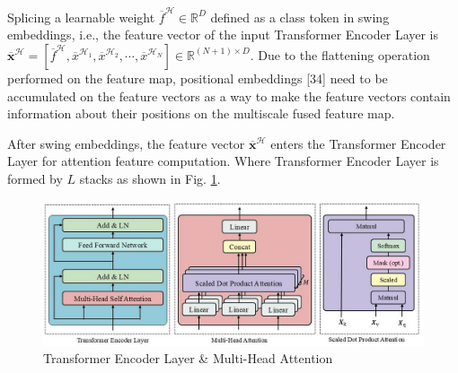 Splicing a learnable weight $\overline{f}^{\mathcal{H}}\in \mathbb{R}^D$ defined as a class token in swing embeddings, i.e., the feature vector of the input Transformer Encoder Layer is $\overline{\boldsymbol{x}}^\mathcal{H}=[\overline{f}^\mathcal{H},\overline{x}^{\mathcal{H}_1},\overline{x}^{\mathcal{H}_2},\cdots ,\overline{x}^{\mathcal{H}_N} ] \in \mathbb{R}^{(N+1)\times D}$. Due to the flattening operation performed on the feature map, positional embeddings [34] need to be accumulated on the feature vectors as a way to make the feature vectors contain information about their positions on the multiscale fused feature map.

After swing embeddings, the feature vector $\overline{\boldsymbol{x}}^\mathcal{H}$ enters the Transformer Encoder Layer for attention feature computation. Where Transformer Encoder Layer is formed by $L$ stacks as shown in Fig. \ref{fig:mhsa}.

\begin{figure}[H]
  \begin{center}
      \includegraphics[scale=0.55]{figure/mhsa.jpg}
  \end{center}
  \caption{Transformer Encoder Layer \& Multi-Head Attention}
  \label{fig:mhsa}
\end{figure}

